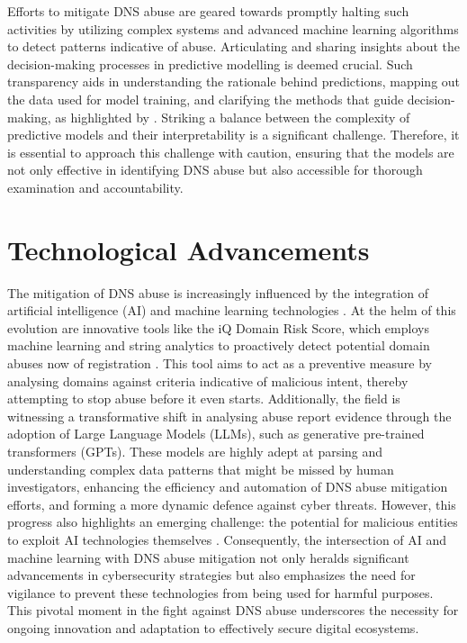 Efforts to mitigate DNS abuse are geared towards promptly halting such activities by utilizing complex systems and advanced machine learning algorithms to detect patterns indicative of abuse. Articulating and sharing insights about the decision-making processes in predictive modelling is deemed crucial. Such transparency aids in understanding the rationale behind predictions, mapping out the data used for model training, and clarifying the methods that guide decision-making, as highlighted by \cite{hussain2022software}. Striking a balance between the complexity of predictive models and their interpretability is a significant challenge. Therefore, it is essential to approach this challenge with caution, ensuring that the models are not only effective in identifying DNS abuse but also accessible for thorough examination and accountability.

\section{Technological Advancements}

The mitigation of DNS abuse is increasingly influenced by the integration of artificial intelligence (AI) and machine learning technologies \cite{goethals2021enabling}. At the helm of this evolution are innovative tools like the iQ Domain Risk Score, which employs machine learning and string analytics to proactively detect potential domain abuses now of registration \cite{dnsabuseAI2023}. This tool aims to act as a preventive measure by analysing domains against criteria indicative of malicious intent, thereby attempting to stop abuse before it even starts. Additionally, the field is witnessing a transformative shift in analysing abuse report evidence through the adoption of Large Language Models (LLMs), such as generative pre-trained transformers (GPTs). These models are highly adept at parsing and understanding complex data patterns that might be missed by human investigators, enhancing the efficiency and automation of DNS abuse mitigation efforts, and forming a more dynamic defence against cyber threats. However, this progress also highlights an emerging challenge: the potential for malicious entities to exploit AI technologies themselves \cite{halvorsenAI2023}.  Consequently, the intersection of AI and machine learning with DNS abuse mitigation not only heralds significant advancements in cybersecurity strategies but also emphasizes the need for vigilance to prevent these technologies from being used for harmful purposes. This pivotal moment in the fight against DNS abuse underscores the necessity for ongoing innovation and adaptation to effectively secure digital ecosystems.

